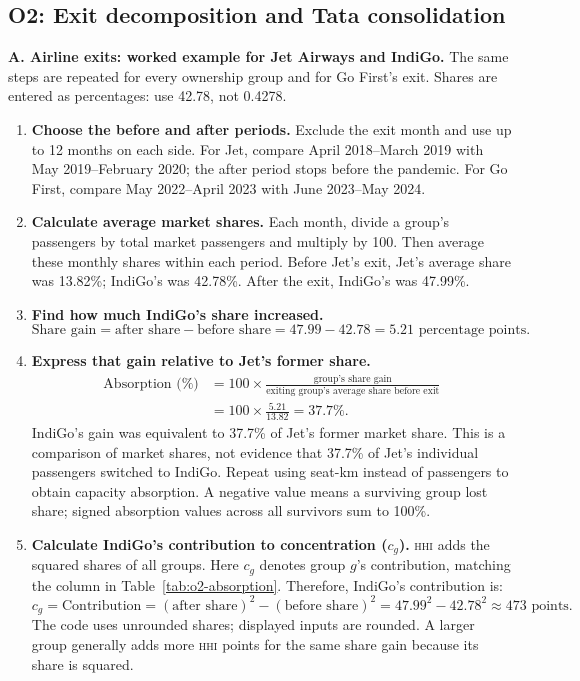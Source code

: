 \documentclass[12pt,a4paper]{article}
\newcommand{\HHI}{\textnormal{\textsc{hhi}}}
\newenvironment{mycontribution}{\par\color{blue}\captionsetup{font+={color=blue}}}{\par}
\begin{document}
\begin{mycontribution}
\subsection*{O2: Exit decomposition and Tata consolidation}
\textbf{A. Airline exits: worked example for Jet Airways and IndiGo.}
The same steps are repeated for every ownership group and for Go First's exit. Shares are entered as percentages: use 42.78, not 0.4278.
\begin{enumerate}[leftmargin=2em]
	\item \textbf{Choose the before and after periods.} Exclude the exit month and use up to 12 months on each side. For Jet, compare April 2018--March 2019 with May 2019--February 2020; the after period stops before the pandemic. For Go First, compare May 2022--April 2023 with June 2023--May 2024.

	\item \textbf{Calculate average market shares.} Each month, divide a group's passengers by total market passengers and multiply by 100. Then average these monthly shares within each period. Before Jet's exit, Jet's average share was 13.82\%; IndiGo's was 42.78\%. After the exit, IndiGo's was 47.99\%.

	\item \textbf{Find how much IndiGo's share increased.}
	\[
	\text{Share gain} = \text{after share} - \text{before share}
	= 47.99 - 42.78 = 5.21\text{ percentage points}.
	\]

	\item \textbf{Express that gain relative to Jet's former share.}
	\[
	\begin{aligned}
	\text{Absorption (\%)} &= 100\times\frac{\text{group's share gain}}{\text{exiting group's average share before exit}}\\
	&= 100\times\frac{5.21}{13.82} = 37.7\%.
	\end{aligned}
	\]
	IndiGo's gain was equivalent to 37.7\% of Jet's former market share. This is a comparison of market shares, not evidence that 37.7\% of Jet's individual passengers switched to IndiGo. Repeat using seat-km instead of passengers to obtain capacity absorption. A negative value means a surviving group lost share; signed absorption values across all survivors sum to 100\%.

	\item \textbf{Calculate IndiGo's contribution to concentration ($c_g$).} \HHI{} adds the squared shares of all groups. Here $c_g$ denotes group $g$'s contribution, matching the column in Table~\ref{tab:o2-absorption}. Therefore, IndiGo's contribution is:
	\[
	c_g = \text{Contribution} = (\text{after share})^2-(\text{before share})^2
	= 47.99^2-42.78^2 \approx 473\text{ points}.
	\]
	The code uses unrounded shares; displayed inputs are rounded. A larger group generally adds more \HHI{} points for the same share gain because its share is squared.


\end{enumerate}
\end{mycontribution}
\end{document}
